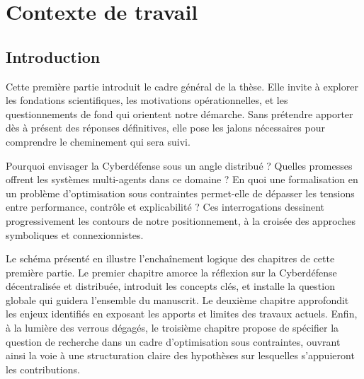 \clearpage
\thispagestyle{empty}
\null
\newpage

\cleardoublepage
{}
\part{Contexte de travail}
\label{part:contexte}

\clearpage
\thispagestyle{empty}
\null
\newpage

\chapter*{Introduction}

\noindent
Cette première partie introduit le cadre général de la thèse. Elle invite à explorer les fondations scientifiques, les motivations opérationnelles, et les questionnements de fond qui orientent notre démarche. Sans prétendre apporter dès à présent des réponses définitives, elle pose les jalons nécessaires pour comprendre le cheminement qui sera suivi.

\medskip

\noindent
Pourquoi envisager la Cyberdéfense sous un angle distribué ? Quelles promesses offrent les systèmes multi-agents dans ce domaine ? En quoi une formalisation en un problème d’optimisation sous contraintes permet-elle de dépasser les tensions entre performance, contrôle et explicabilité ? Ces interrogations dessinent progressivement les contours de notre positionnement, à la croisée des approches symboliques et connexionnistes.

\medskip

\noindent
Le schéma présenté en  illustre l’enchaînement logique des chapitres de cette première partie. Le premier chapitre amorce la réflexion sur la Cyberdéfense décentralisée et distribuée, introduit les concepts clés, et installe la question globale qui guidera l’ensemble du manuscrit. Le deuxième chapitre approfondit les enjeux identifiés en exposant les apports et limites des travaux actuels. Enfin, à la lumière des verrous dégagés, le troisième chapitre propose de spécifier la question de recherche dans un cadre d’optimisation sous contraintes, ouvrant ainsi la voie à une structuration claire des hypothèses sur lesquelles s’appuieront les contributions.

